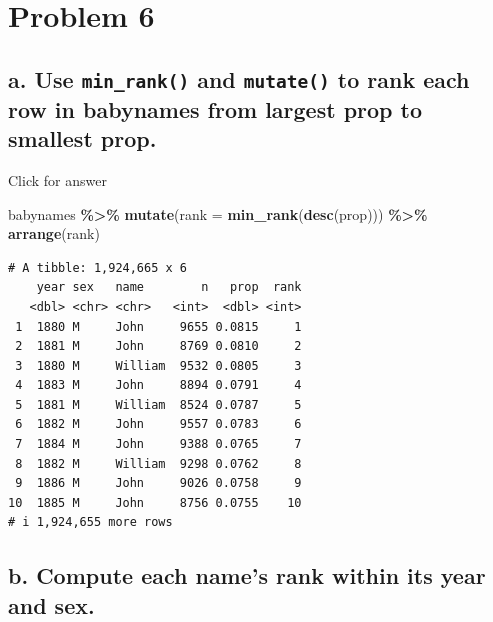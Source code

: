 \documentclass[
]{book}
\newenvironment{Shaded}{\begin{snugshade}}{\end{snugshade}}
\newcommand{\AttributeTok}[1]{\textcolor[rgb]{0.13,0.29,0.53}{#1}}
\newcommand{\FunctionTok}[1]{\textcolor[rgb]{0.13,0.29,0.53}{\textbf{#1}}}
\newcommand{\NormalTok}[1]{#1}
\newcommand{\SpecialCharTok}[1]{\textcolor[rgb]{0.81,0.36,0.00}{\textbf{#1}}}
\begin{document}
\hypertarget{problem-6}{%
\section{Problem 6}\label{problem-6}}

\hypertarget{a.-use-min_rank-and-mutate-to-rank-each-row-in-babynames-from-largest-prop-to-smallest-prop.}{%
\subsection{\texorpdfstring{a. Use \texttt{min\_rank()} and \texttt{mutate()} to rank each row in babynames from largest prop to smallest prop.}{a. Use min\_rank() and mutate() to rank each row in babynames from largest prop to smallest prop.}}\label{a.-use-min_rank-and-mutate-to-rank-each-row-in-babynames-from-largest-prop-to-smallest-prop.}}

Click for answer

\begin{Shaded}
\begin{Highlighting}[]
\NormalTok{babynames }\SpecialCharTok{\%\textgreater{}\%} \FunctionTok{mutate}\NormalTok{(}\AttributeTok{rank =} \FunctionTok{min\_rank}\NormalTok{(}\FunctionTok{desc}\NormalTok{(prop))) }\SpecialCharTok{\%\textgreater{}\%} \FunctionTok{arrange}\NormalTok{(rank)}
\end{Highlighting}
\end{Shaded}

\begin{verbatim}
# A tibble: 1,924,665 x 6
    year sex   name        n   prop  rank
   <dbl> <chr> <chr>   <int>  <dbl> <int>
 1  1880 M     John     9655 0.0815     1
 2  1881 M     John     8769 0.0810     2
 3  1880 M     William  9532 0.0805     3
 4  1883 M     John     8894 0.0791     4
 5  1881 M     William  8524 0.0787     5
 6  1882 M     John     9557 0.0783     6
 7  1884 M     John     9388 0.0765     7
 8  1882 M     William  9298 0.0762     8
 9  1886 M     John     9026 0.0758     9
10  1885 M     John     8756 0.0755    10
# i 1,924,655 more rows
\end{verbatim}

\hypertarget{b.-compute-each-names-rank-within-its-year-and-sex.}{%
\subsection{b. Compute each name's rank within its year and sex.}\label{b.-compute-each-names-rank-within-its-year-and-sex.}}
\end{document}
